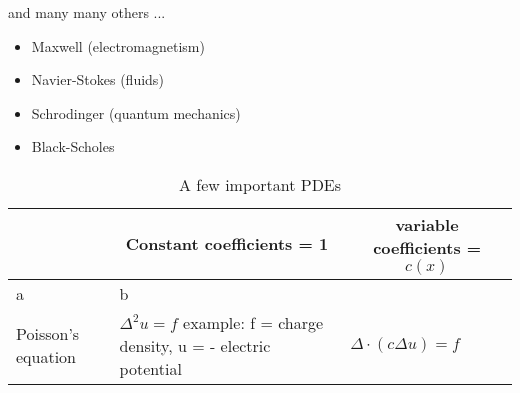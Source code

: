 \documentclass{article}
\theoremstyle{mytheoremstyle}
\theoremstyle{mytheoremstyle}
\theoremstyle{myproblemstyle}
\begin{document}
    \noindent and many many others ...
    \begin{itemize}
	\item Maxwell (electromagnetism)
	\item Navier-Stokes (fluids)
	\item Schrodinger (quantum mechanics)
	\item Black-Scholes
    \end{itemize}

    \begin{table}
    	\caption{A few important PDEs}\label{tab:pdes}
    	\begin{center}
    		\begin{tabular}[c]{l|l|l}
    			\hline
    			\multicolumn{1}{c|}{\textbf{}} & 
			\multicolumn{1}{c|}{\textbf{Constant coefficients = 1}} &
			\multicolumn{1}{c}{\textbf{variable coefficients = $c(x) $}} \\
    			\hline
    			a & b \\
			
			\hline
			Poisson's equation &
			$ \Delta^2 u = f $
			example: f = charge density,
			u = - electric potential &
			$ \Delta \cdot (c \Delta u) = f $ \\

			\hline

    			
    		\end{tabular}
    	\end{center}
    \end{table}
    
    
\end{document}
